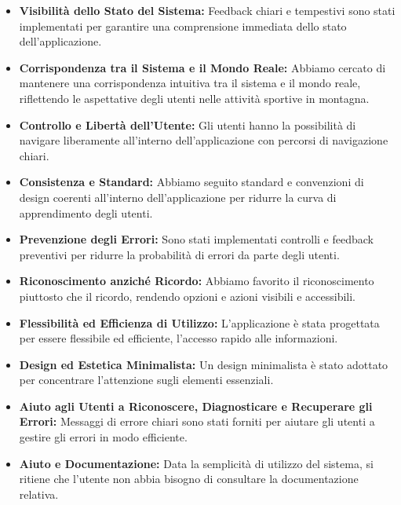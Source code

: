 \begin{itemize}
    \item \textbf{Visibilità dello Stato del Sistema:} Feedback chiari e tempestivi sono stati implementati per garantire una comprensione immediata dello stato dell'applicazione.
    
    \item \textbf{Corrispondenza tra il Sistema e il Mondo Reale:} Abbiamo cercato di mantenere una corrispondenza intuitiva tra il sistema e il mondo reale, riflettendo le aspettative degli utenti nelle attività sportive in montagna.
  
    \item \textbf{Controllo e Libertà dell'Utente:} Gli utenti hanno la possibilità di navigare liberamente all'interno dell'applicazione con percorsi di navigazione chiari.
  
    \item \textbf{Consistenza e Standard:} Abbiamo seguito standard e convenzioni di design coerenti all'interno dell'applicazione per ridurre la curva di apprendimento degli utenti.
  
    \item \textbf{Prevenzione degli Errori:} Sono stati implementati controlli e feedback preventivi per ridurre la probabilità di errori da parte degli utenti.
  
    \item \textbf{Riconoscimento anziché Ricordo:} Abbiamo favorito il riconoscimento piuttosto che il ricordo, rendendo opzioni e azioni visibili e accessibili.
  
    \item \textbf{Flessibilità ed Efficienza di Utilizzo:} L'applicazione è stata progettata per essere flessibile ed efficiente, l'accesso rapido alle informazioni.
  
    \item \textbf{Design ed Estetica Minimalista:} Un design minimalista è stato adottato per concentrare l'attenzione sugli elementi essenziali.
  
    \item \textbf{Aiuto agli Utenti a Riconoscere, Diagnosticare e Recuperare gli Errori:} Messaggi di errore chiari sono stati forniti per aiutare gli utenti a gestire gli errori in modo efficiente.
  
    \item \textbf{Aiuto e Documentazione:} Data la semplicità di utilizzo del sistema, si ritiene che l'utente non abbia bisogno di consultare la documentazione relativa.
  \end{itemize}
  
